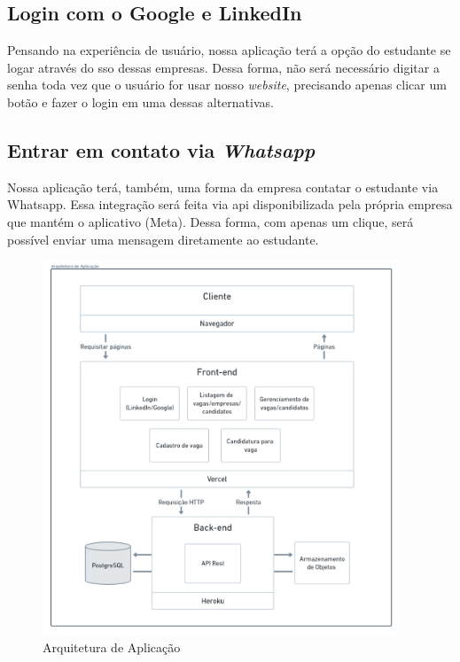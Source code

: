 \subsection{Login com o Google e LinkedIn}
Pensando na experiência de usuário, nossa aplicação terá a opção do estudante se logar através do \ac{sso} dessas empresas. Dessa forma, não será necessário digitar a senha toda vez que o usuário for usar nosso \emph{website}, precisando apenas clicar um botão e fazer o login em uma dessas alternativas.

\subsection{Entrar em contato via \emph{Whatsapp}}
Nossa aplicação terá, também, uma forma da empresa contatar o estudante via Whatsapp. Essa integração será feita via \ac{api} disponibilizada pela própria empresa que mantém o aplicativo (Meta). Dessa forma, com apenas um clique, será possível enviar uma mensagem diretamente ao estudante.

\begin{figure}[htb]
	\centering
	\caption{\label{fig_arq_app}Arquitetura de Aplicação}
	\includegraphics[width=0.95\textwidth]{../Figuras/arq-proj-arq-app.png}
\end{figure}

